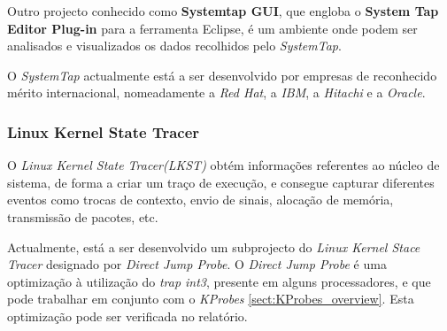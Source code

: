 Outro projecto conhecido como \textbf{Systemtap GUI}, que engloba o \textbf{System Tap Editor Plug-in} para a ferramenta Eclipse, é um ambiente onde podem ser analisados e visualizados os dados recolhidos pelo \textit{SystemTap}.

O \textit{SystemTap} actualmente está a ser desenvolvido por empresas de reconhecido mérito internacional, nomeadamente a \textit{Red Hat}, a \textit{IBM}, a \textit{Hitachi} e a \textit{Oracle}.

\subsubsection{Linux Kernel State Tracer}

O \textit{Linux Kernel State Tracer(LKST)} obtém informações referentes ao núcleo de sistema, de forma a criar um traço de execução, e consegue capturar diferentes eventos como trocas de contexto, envio de sinais, alocação de memória, transmissão de pacotes, etc.

\label{cap:djprobe}
Actualmente, está a ser desenvolvido um subprojecto do \textit{Linux Kernel Stace Tracer} designado por \textit{Direct Jump Probe}.
O \textit{Direct Jump Probe} é uma optimização à utilização do \textit{trap int3}, presente em alguns processadores, e que pode trabalhar em conjunto com o \textit{KProbes} \ref{sect:KProbes_overview}.
Esta optimização pode ser verificada no relatório\cite{Hiramatsu2005}.


